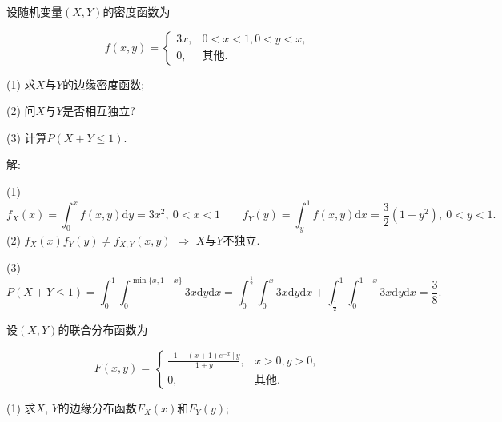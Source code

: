 \documentclass[standard]{ExBook}
\begin{document}
\begin{qitems}
\vspace{-5em}

    \begin{bbox}
    \begin{shaded}
        \qitem
设随机变量$(X,Y)$的密度函数为
\vspace{-2em}
\begin{center}
\begin{equation}
    f(x,y)=
    \left\{
    \begin{array}{cl}
        \nonumber
        3x, &0<x<1,0<y<x,\\
        0, & \text{其他}.
    \end{array}
    \right.
\end{equation}
\end{center}
(1) 求$X$与$Y$的边缘密度函数;

(2) 问$X$与$Y$是否相互独立?

(3) 计算$P(X+Y\leq 1)$.
    \end{shaded}
    \end{bbox}

\vspace{-5em}

    \begin{bbox}
解: 

(1)
$$f_{X}(x)=\int_{0}^{x}f(x,y)\mathrm{d}y=3x^2,\ 0<x<1\qquad f_{Y}(y)=\int_{y}^{1}f(x,y)\mathrm{d}x=\frac{3}{2}(1-y^2),\ 0<y<1.$$
(2) $f_{X}(x)f_{Y}(y)\neq f_{X,Y}(x,y)$ $\Longrightarrow$ $X$与$Y$不独立.

(3)
$$P(X+Y\leq1)=\int_{0}^{1}\int_{0}^{\min\{x,1-x\}}3x\mathrm{d}y\mathrm{d}x=\int_{0}^{\frac{1}{2}}\int_{0}^{x}3x\mathrm{d}y\mathrm{d}x+\int_{\frac{1}{2}}^{1}\int_{0}^{1-x}3x\mathrm{d}y\mathrm{d}x=\frac{3}{8}.$$
    \end{bbox}

\vspace{-5em}

    \begin{bbox}
    \begin{shaded}
        \qitem
设$(X,Y)$的联合分布函数为
\vspace{-2em}
\begin{center}
\begin{equation}
    F(x,y)=
    \left\{
    \begin{array}{cl}
        \nonumber
        \displaystyle\frac{\left[1-(x+1)e^{-x}\right]y}{1+y}, & x>0, y>0,\\
        0, & \text{其他}.
    \end{array}
    \right.
\end{equation}
\end{center}
(1) 求$X$, $Y$的边缘分布函数$F_{X}(x)$和$F_{Y}(y)$;


\end{shaded}
\end{bbox}
\end{qitems}
\end{document}
